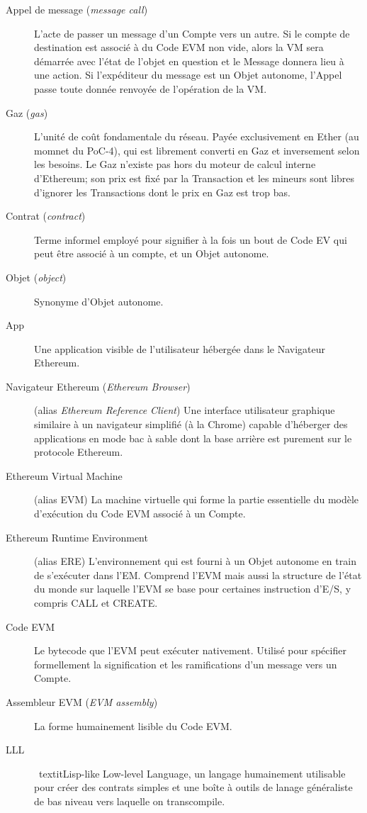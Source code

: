 \documentclass[9pt,oneside]{amsart}
\begin{document}
\begin{description}
\item[Appel de message (\textit{message call})\,]
  L'acte de passer un message d'un Compte vers un autre. Si le compte de destination est associé à du Code EVM non vide, alors la VM sera démarrée avec l'état de l'objet en question et le Message donnera lieu à une action. Si l'expéditeur du message est un Objet autonome, l'Appel passe toute donnée renvoyée de l'opération de la VM.

\item[Gaz (\textit{gas})\,]
  L'unité de coût fondamentale du réseau. Payée exclusivement en Ether (au momnet du PoC-4), qui est librement converti en Gaz et inversement selon les besoins. Le Gaz n'existe pas hors du moteur de calcul interne d'Ethereum; son prix est fixé par la Transaction et les mineurs sont libres d'ignorer les Transactions dont le prix en Gaz est trop bas.

\item[Contrat (\textit{contract})\,]
  Terme informel employé pour signifier à la fois un bout de Code EV qui peut être associé à un compte, et un Objet autonome.

\item[Objet (\textit{object})\,]
  Synonyme d'Objet autonome.

\item[App\,]
  Une application visible de l'utilisateur hébergée dans le Navigateur Ethereum.

\item[Navigateur Ethereum (\textit{Ethereum Browser})\,]
  (alias \textit{Ethereum Reference Client}) Une interface utilisateur graphique similaire à un navigateur simplifié (à la Chrome) capable d'héberger des applications en mode bac à sable dont la base arrière est purement sur le protocole Ethereum.

\item[Ethereum Virtual Machine\,]
  (alias EVM) La machine virtuelle qui forme la partie essentielle du modèle d'exécution du Code EVM associé à un Compte.

\item[Ethereum Runtime Environment\,]
  (alias ERE) L'environnement qui est fourni à un Objet autonome en train de s'exécuter dans l'EM. Comprend l'EVM mais aussi la structure de l'état du monde sur laquelle l'EVM se base pour certaines instruction d'E/S, y compris CALL et CREATE.

\item[Code EVM\,]
  Le bytecode que l'EVM peut exécuter nativement. Utilisé pour spécifier formellement la signification et les ramifications d'un message vers un Compte.

\item[Assembleur EVM (\textit{EVM assembly})\,]
  La forme humainement lisible du Code EVM.

\item[LLL\,] \
  textit{Lisp-like Low-level Language}, un langage humainement utilisable pour créer des contrats simples et une boîte à outils de lanage généraliste de bas niveau vers laquelle on transcompile.

\end{description}
\end{document}

